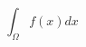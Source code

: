 \documentclass{standalone}
\begin{document}
\begin{equation*}
  \int_\Omega f(x) dx
\end{equation*}
  
\end{document}
